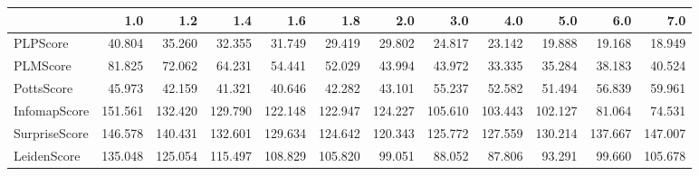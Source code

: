 \begin{tabular}{lrrrrrrrrrrr}
\toprule
{} &     1.0 &     1.2 &     1.4 &     1.6 &     1.8 &     2.0 &     3.0 &     4.0 &     5.0 &     6.0 &     7.0 \\
\midrule
PLPScore      &  40.804 &  35.260 &  32.355 &  31.749 &  29.419 &  29.802 &  24.817 &  23.142 &  19.888 &  19.168 &  18.949 \\
PLMScore      &  81.825 &  72.062 &  64.231 &  54.441 &  52.029 &  43.994 &  43.972 &  33.335 &  35.284 &  38.183 &  40.524 \\
PottsScore    &  45.973 &  42.159 &  41.321 &  40.646 &  42.282 &  43.101 &  55.237 &  52.582 &  51.494 &  56.839 &  59.961 \\
InfomapScore  & 151.561 & 132.420 & 129.790 & 122.148 & 122.947 & 124.227 & 105.610 & 103.443 & 102.127 &  81.064 &  74.531 \\
SurpriseScore & 146.578 & 140.431 & 132.601 & 129.634 & 124.642 & 120.343 & 125.772 & 127.559 & 130.214 & 137.667 & 147.007 \\
LeidenScore   & 135.048 & 125.054 & 115.497 & 108.829 & 105.820 &  99.051 &  88.052 &  87.806 &  93.291 &  99.660 & 105.678 \\
\bottomrule
\end{tabular}
